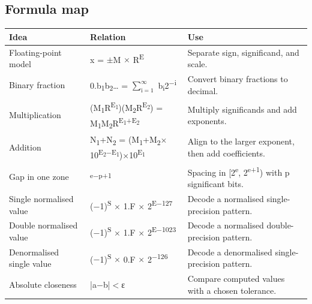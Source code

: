 \documentclass[11pt]{article}
\begin{document}
\begin{keepsection}
\section{Formula map}

\begin{center}\small\begin{tabularx}{\linewidth}{>{\raggedright\arraybackslash}X>{\raggedright\arraybackslash}X>{\raggedright\arraybackslash}X}\toprule
\textbf{Idea} & \textbf{Relation} & \textbf{Use} \\ \midrule
Floating-point model & x = \ensuremath{\pm}M \ensuremath{\times} R\textsuperscript{E} & Separate sign, significand, and scale. \\
Binary fraction & 0.b\textsubscript{1}b\textsubscript{2}… = $\sum_{\mathrm{i}=1}^{\infty } $ b\textsubscript{i}2\textsuperscript{\ensuremath{-}i} & Convert binary fractions to decimal. \\
Multiplication & (M\textsubscript{1}R\textsuperscript{E\textsubscript{1}})(M\textsubscript{2}R\textsuperscript{E\textsubscript{2}}) = M\textsubscript{1}M\textsubscript{2}R\textsuperscript{E\textsubscript{1}+E\textsubscript{2}} & Multiply significands and add exponents. \\
Addition & N\textsubscript{1}+N\textsubscript{2} = (M\textsubscript{1}+M\textsubscript{2}\ensuremath{\times}10\textsuperscript{E\textsubscript{2}\ensuremath{-}E\textsubscript{1}})\ensuremath{\times}10\textsuperscript{E\textsubscript{1}} & Align to the larger exponent, then add coefficients. \\
Gap in one zone & 2\textsuperscript{e\ensuremath{-}p+1} & Spacing in [2\textsuperscript{e}, 2\textsuperscript{e+1}) with p significant bits. \\
Single normalised value & (\ensuremath{-}1)\textsuperscript{S} \ensuremath{\times} 1.F \ensuremath{\times} 2\textsuperscript{E\ensuremath{-}127} & Decode a normalised single-precision pattern. \\
Double normalised value & (\ensuremath{-}1)\textsuperscript{S} \ensuremath{\times} 1.F \ensuremath{\times} 2\textsuperscript{E\ensuremath{-}1023} & Decode a normalised double-precision pattern. \\
Denormalised single value & (\ensuremath{-}1)\textsuperscript{S} \ensuremath{\times} 0.F \ensuremath{\times} 2\textsuperscript{\ensuremath{-}126} & Decode a denormalised single-precision pattern. \\
Absolute closeness & |a\ensuremath{-}b|\ensuremath{<}ε & Compare computed values with a chosen tolerance. \\
\bottomrule\end{tabularx}\end{center}


\end{keepsection}
\end{document}
